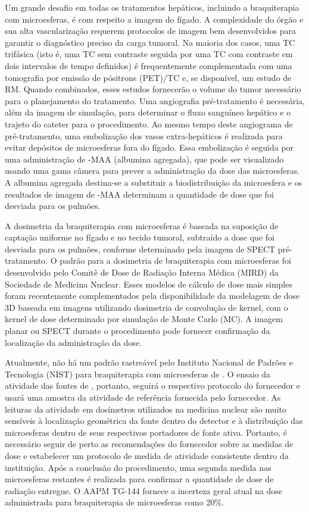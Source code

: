 \documentclass[11pt,a4paper]{article}
\begin{document}
    Um grande desafio em todas os tratamentos hepáticos, incluindo a braquiterapia com microesferas, é com respeito a imagem do fígado. A complexidade do órgão e sua alta vascularização requerem protocolos de imagem bem desenvolvidos para garantir o diagnóstico preciso da carga tumoral. Na maioria dos casos, uma TC trifásica (isto é, uma TC sem contraste seguida por uma TC com contraste em dois intervalos de tempo definidos) é frequentemente complementada com uma tomografia por emissão de pósitrons (PET)/TC e, se disponível, um estudo de RM. Quando combinados, esses estudos fornecerão o volume do tumor necessário para o planejamento do tratamento. Uma angiografia pré-tratamento é necessária, além da imagem de simulação, para determinar o fluxo sanguíneo hepático e o trajeto do cateter para o procedimento. Ao mesmo tempo deste angiograma de pré-tratamento, uma embolização dos vasos extra-hepáticos é realizada para evitar depósitos de microesferas fora do fígado. Essa embolização é seguida por uma administração de -MAA (albumina agregada), que pode ser visualizado usando uma gama câmera para prever a administração da dose das microesferas. A albumina agregada destina-se a substituir a biodistribuição da microesfera e os resultados de imagem de -MAA determinam a quantidade de dose que foi desviada para os pulmões.

    A dosimetria da braquiterapia com microesferas é baseada na suposição de captação uniforme no fígado e no tecido tumoral, subtraído a dose que foi desviada para os pulmões, conforme determinado pela imagem de SPECT pré-tratamento. O padrão para a dosimetria de braquiterapia com microesferas foi desenvolvido pelo Comitê de Dose de Radiação Interna Médica (MIRD) da Sociedade de Medicina Nuclear. Esses modelos de cálculo de dose mais simples foram recentemente complementados pela disponibilidade da modelagem de dose 3D baseada em imagens utilizando dosimetria de convolução de kernel, com o kernel de dose determinado por simulação de Monte Carlo (MC). A imagem planar ou SPECT durante o procedimento pode fornecer confirmação da localização da administração da dose.

    Atualmente, não há um padrão rastreável pelo Instituto Nacional de Padrões e Tecnologia (NIST) para braquiterapia com microesferas de . O ensaio da atividade das fontes de , portanto, seguirá o respectivo protocolo do fornecedor e usará uma amostra da atividade de referência fornecida pelo fornecedor. As leituras da atividade em dosímetros utilizados na medicina nuclear são muito sensíveis à localização geométrica da fonte dentro do detector e à distribuição das microesferas dentro de seus respectivos portadores de fonte ativa. Portanto, é necessário seguir de perto as recomendações do fornecedor sobre as medidas de dose e estabelecer um protocolo de medida de atividade consistente dentro da instituição. Após a conclusão do procedimento, uma segunda medida nas microesferas restantes é realizada para confirmar a quantidade de dose de radiação entregue. O AAPM TG-144 fornece a incerteza geral atual na dose administrada para braquiterapia de microesferas  como 20\%.
\end{document}
